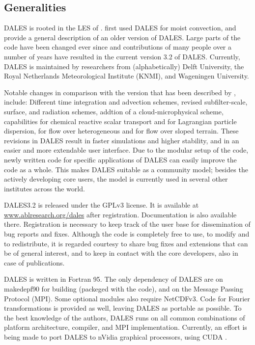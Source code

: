 \subsection{Generalities}
DALES  is rooted in the LES of \citet{nieuwstadt1986}. \citet{cuijpers1993} first used DALES for moist convection, and provide a general description of an older version of DALES. Large parts of the code have been changed ever since and  contributions of many people over a number of years have resulted in the current version 3.2 of DALES. Currently, DALES is maintained by researchers from (alphabetically) Delft University, the Royal Netherlands Meteorological Institute (KNMI), and Wageningen University.

Notable changes in comparison with the version that has been described by \citet{cuijpers1993}, include: Different time integration and advection schemes, revised subfilter-scale, surface, and radiation schemes, addtion of a  cloud-microphysical scheme, capabilities for chemical reactive scalar transport and for Lagrangian particle dispersion, for flow over heterogeneous and for flow over sloped terrain. These revisions  in DALES result in faster simulations and higher stability, and in an easier and more extendable user interface. Due to the modular setup of the code, newly written code for specific applications of DALES can easily improve the code as a whole. This makes DALES suitable as a  community model; besides the actively developing core users, the model is currently used in several other institutes across the world.

DALES3.2 is released under the GPLv3 license. It is available at \url{www.ablresearch.org/dales} after registration. Documentation is also available there. Registration is necessary to keep track of the user base for dissemination of bug reports and fixes. Although the code is completely free to use, to modify and to redistribute, it is regarded courtesy to share bug fixes and extensions that can be of general interest, and to keep in contact with the core developers, also in case of publications.

DALES is written in Fortran 95. The only dependency of DALES are on makedepf90 for building (packeged with the code), and on the Message Passing Protocol (MPI). Some optional modules also require NetCDFv3. Code for Fourier transformations is provided as well, leaving DALES as portable as possible. To the best knowledge of the authors, DALES runs on all common combinations of platform architecture, compiler, and MPI implementation. Currently, an effort is being made to port DALES  to nVidia graphical processors, using CUDA \citep{griffith2009}.

